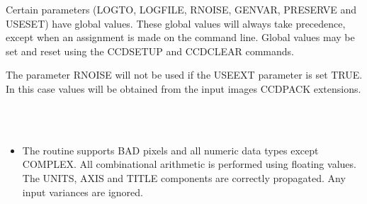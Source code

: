 \documentclass[twoside,11pt]{article}
\newcommand{\htmlref}[2]{#1}
\renewcommand{\_}{\texttt{\symbol{95}}}
\newcommand{\xroutine}[1]{\htmlref{{\sc #1}}{#1}}
\newcommand{\sstimplementationstatus}[1]{
   \item[{Implementation Status:}] \mbox{} \\[1.3ex] #1}
\newcommand{\sstitemlist}[1]{
  \mbox{} \\
  \vspace{-3.5ex}
  \begin{itemize}
     #1
  \end{itemize}
}
\newcommand{\sstitem}{\item}
\newcommand{\sstimplementationstatus}[1]{
      \item[Implementation Status:] #1
   }
\newcommand{\sstitemlist}[1]{
      \begin{itemize}
         #1
      \end{itemize}
      \\
   }
\newcommand{\sstitem}{\item}
\begin{document}
{{      Certain parameters (LOGTO, LOGFILE, RNOISE, GENVAR, PRESERVE and USESET)
      have global values. These global values will always take
      precedence, except when an assignment is made on the command line.
      Global values may be set and reset using the \xroutine{CCDSETUP} and
      \xroutine{CCDCLEAR} commands.

      The parameter RNOISE will not be used if the USEEXT parameter is
      set TRUE. In this case values will be obtained from the input images
      CCDPACK extensions.
   }
\newpage
   \sstimplementationstatus{
      \sstitemlist{

         \sstitem
         The routine supports BAD pixels and all numeric data types
           except COMPLEX.  All combinational arithmetic is performed using
           floating values.  The UNITS, AXIS and TITLE components
           are correctly propagated. Any input variances are ignored.
      }
   }
}
\end{document}
